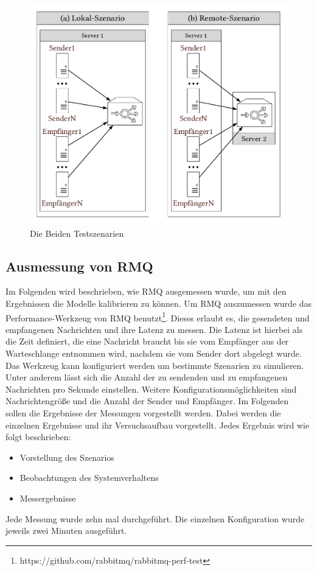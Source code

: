 \begin{figure}
\center
  \includegraphics[width=1\textwidth]{images/measurement/benchmarkSzenarioOverview.pdf}
  \caption{Die Beiden Testszenarien}
  \label{img:machineoverview}
\end{figure}

\subsection{Ausmessung von RMQ}
\label{sec:rmqBenchmark}
Im Folgenden wird beschrieben, wie RMQ ausgemessen wurde, um mit den Ergebnissen die Modelle kalibrieren zu können. Um RMQ auszumessen wurde das Performance-Werkzeug von RMQ benutzt\footnote{https://github.com/rabbitmq/rabbitmq-perf-test}. Dieses erlaubt es, die gesendeten und empfangenen Nachrichten und ihre Latenz zu messen. Die Latenz ist hierbei als die Zeit definiert, die eine Nachricht braucht bis sie vom Empfänger aus der Warteschlange entnommen wird, nachdem sie vom Sender dort abgelegt wurde. Das Werkzeug kann konfiguriert werden um bestimmte Szenarien zu simulieren. Unter anderem lässt sich die Anzahl der zu sendenden und zu empfangenen Nachrichten pro Sekunde einstellen. Weitere Konfigurationsmöglichkeiten sind Nachrichtengröße und die Anzahl der Sender und Empfänger. Im Folgenden sollen die Ergebnisse der Messungen vorgestellt werden. Dabei werden die einzelnen Ergebnisse und ihr Versuchsaufbau vorgestellt. Jedes Ergebnis wird wie folgt beschrieben: 
\begin{itemize}
    \item Vorstellung des Szenarios
    \item Beobachtungen des Systemverhaltens
    \item Messergebnisse
\end{itemize}
Jede Messung wurde zehn mal durchgeführt. Die einzelnen Konfiguration wurde jeweils zwei Minuten ausgeführt. 



